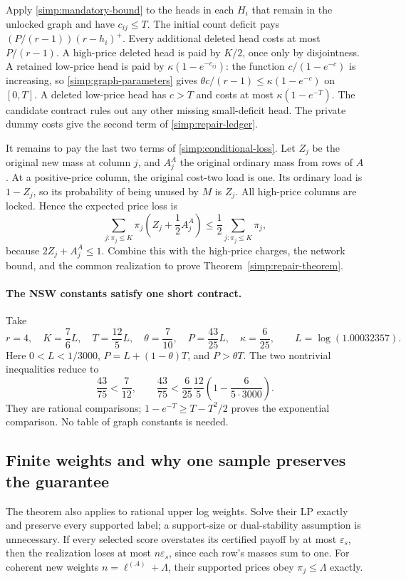 Apply \eqref{simp:mandatory-bound} to the heads in each $H_i$ that
remain in the unlocked graph and have $c_{ij}\le T$.
The initial count deficit pays $(P/(r-1))(r-h_i)^+$.
Every additional deleted head costs at most $P/(r-1)$.
A high-price deleted head is paid by $K/2$, once only by disjointness.
A retained low-price head is paid by $\kappa(1-e^{-c_{ij}})$:
the function $c/(1-e^{-c})$ is increasing, so
\eqref{simp:graph-parameters} gives
$\theta c/(r-1)\le\kappa(1-e^{-c})$ on $[0,T]$.
A deleted low-price head has $c>T$ and costs at most
$\kappa(1-e^{-T})$.  The candidate contract rules out any other
missing small-deficit head.  The private dummy costs give the second
term of \eqref{simp:repair-ledger}.

It remains to pay the last two terms of \eqref{simp:conditional-loss}.
Let $Z_j$ be the original new mass at column $j$, and $A_j^A$ the
original ordinary mass from rows of $A$.  At a positive-price column,
the original cost-two load is one.  Its ordinary load is $1-Z_j$,
so its probability of being unused by $M$ is $Z_j$.
All high-price columns are locked.  Hence the expected price loss is
\[
 \sum_{j:\pi_j\le K}\pi_j\left(Z_j+\frac12 A_j^A\right)
       \le\frac12\sum_{j:\pi_j\le K}\pi_j,
\]
because $2Z_j+A_j^A\le1$.  Combine this with the high-price charges,
the network bound, and the common realization to prove
Theorem~\ref{simp:repair-theorem}.

\paragraph{The NSW constants satisfy one short contract.}
Take
\[
 r=4,\quad K=\frac76L,\quad T=\frac{12}{5}L,\quad
 \theta=\frac7{10},\quad P=\frac{43}{25}L,\quad
 \kappa=\frac6{25},\qquad L=\log(1.00032357).
\]
Here $0<L<1/3000$, $P=L+(1-\theta)T$, and $P>\theta T$.
The two nontrivial inequalities reduce to
\[
 \frac{43}{75}<\frac7{12},\qquad
 \frac{43}{75}
 <\frac6{25}\frac{12}{5}
                  \left(1-\frac6{5\cdot3000}\right).
\]
They are rational comparisons; $1-e^{-T}\ge T-T^2/2$ proves the
exponential comparison.  No table of graph constants is needed.

\subsection{Finite weights and why one sample preserves the guarantee}

The theorem also applies to rational upper log weights.  Solve their
LP exactly and preserve every supported label; a support-size or
dual-stability assumption is unnecessary.  If every selected score
overstates its certified payoff by at most $\varepsilon_s$, then the
realization loses at most $n\varepsilon_s$, since each row's masses
sum to one.  For coherent new weights $n=\ell^{(.4)}+\Lambda$, their
supported prices obey $\pi_j\le\Lambda$ exactly.

